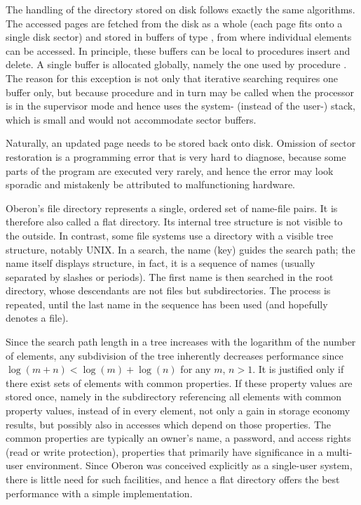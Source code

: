 The handling of the directory stored on disk follows exactly the same algorithms. The accessed pages are fetched from the disk as a whole (each page fits onto a single disk sector) and stored in buffers of type , from where individual elements can be accessed. In principle, these buffers can be local to procedures insert and delete. A single buffer is allocated globally, namely the one used by procedure . The reason for this exception is not only that iterative searching requires one buffer only, but because procedure  and in turn  may be called when the processor is in the supervisor mode and hence uses the system- (instead of the user-) stack, which is small and would not accommodate sector buffers.

Naturally, an updated page needs to be stored back onto disk. Omission of sector restoration is a programming error that is very hard to diagnose, because some parts of the program are executed very rarely, and hence the error may look sporadic and mistakenly be attributed to malfunctioning hardware.

Oberon's file directory represents a single, ordered set of name-file pairs. It is therefore also called a flat directory. Its internal tree structure is not visible to the outside. In contrast, some file systems use a directory with a visible tree structure, notably UNIX. In a search, the name (key) guides the search path; the name itself displays structure, in fact, it is a sequence of names (usually separated by slashes or periods). The first name is then searched in the root directory, whose descendants are not files but subdirectories. The process is repeated, until the last name in the sequence has been used (and hopefully denotes a file).

Since the search path length in a tree increases with the logarithm of the number of elements, any subdivision of the tree inherently decreases performance since $\log{(m + n)} < \log{(m)} + \log{(n)}$ for any $m$, $n > 1$. It is justified only if there exist sets of elements with common properties. If these property values are stored once, namely in the subdirectory referencing all elements with common property values, instead of in every element, not only a gain in storage economy results, but possibly also in accesses which depend on those properties. The common properties are typically an owner's name, a password, and access rights (read or write protection), properties that primarily have significance in a multi-user environment. Since Oberon was conceived explicitly as a single-user system, there is little need for such facilities, and hence a flat directory offers the best performance with a simple implementation.

